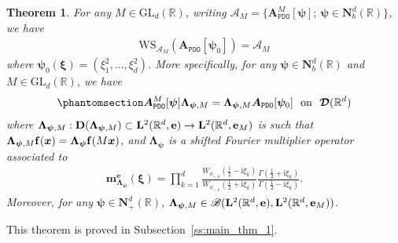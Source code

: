 \documentclass[12pt]{amsart}
\newcommand{\hlabel}{\phantomsection\label}
\numberwithin{equation}{section}
\newcommand{\bb}{\mathbb}
\newcommand{\cc}{\mathcal}
\newcommand{\ccP}{\mathscr{P}}
\newcommand{\ttt}{\mathtt}
\newcommand{\bmrm}[2][2]{\mathbf{#2}^{#1}}
\newcommand{\AM}{\bm{A}^M}
\newcommand{\D}{\mathbf{D}}
\newcommand{\LL}{\Lambda}
\renewcommand{\i}{\mathrm{i}}
\newcommand{\LLRe}{\bmrm{L}(\bb R^d,{\bf e})}
\newcommand{\NN}{\mathbf{N}}
\newcommand{\ccA}{\mathscr{A}}
\newcommand{\cD}{\mathcal{D}}
\newtheorem{thm}{Theorem}[section]
\theoremstyle{definition}
\theoremstyle{assump}
\theoremstyle{remark}
\begin{document}
	\begin{thm}\hlabel{thm1:main_thm_1} For any $M\in\mathrm{GL}_d(\bb R)$, writing $ \mathscr{A}_M=\{\bm{A}^M_{\ttt{PDO}}[\bm{\psi}]; \: \bm{\psi}\in\NN^d_b(\bb R)\}$, we have
			\begin{align*}
				\mathrm{WS}_{\ccA_M}(\bm{A}_\ttt{PDO}[\bm\psi_0])=\ccA_M
			\end{align*}
where $\bm{\psi}_0(\bm{\xi})=(\xi^2_1,\ldots,\xi^2_d)$. More specifically, for any $\bm{\psi}\in\NN^d_b(\bb R)$ and $M\in\mathrm{GL}_d(\bb{R})$, we have
\begin{align} \hlabel{eq:wsob}
	\AM_\ttt{PDO}[\bm\psi]\bm{\LL}_{\bm\psi,M}=\bm{\LL}_{\bm\psi,M}\bm{A}_\ttt{PDO}[\bm\psi_0] \ \text{ on } \ \bm{\cc{D}}(\bb R^d)
\end{align}
where $\bm{\Lambda}_{\bm \psi,M}:\D(\bm{\Lambda}_{\bm \psi,M}) \subset \LLRe\to \bmrm{L}(\bb R^d,{\bf e}_M)$ is such that $\bm{\Lambda}_{\bm\psi,M}{\bf f}(\bm x)=\bm{\Lambda_\psi}{\bf f}(M\bm x)$, and $\bm{\Lambda}_{\bm \psi}$ is a shifted Fourier multiplier operator associated to
\begin{align*}
	\mathbf{m}^{\mathbf{e}}_{\bm{\Lambda}_{\bm\psi}}(\bm{\xi})=\prod_{k=1}^d \frac{W_{\phi_{+,k}}(\frac{1}{2}-\i\xi_k)}{W_{\phi_{-,k}}(\frac{1}{2}+\i\xi_k)}\frac{\Gamma(\frac{1}{2}+\i\xi_k)}{\Gamma(\frac{1}{2}-\i\xi_k)}.
\end{align*}
Moreover, for any $\bm{\psi}\in\NN^d_+(\bb R)$, $\bm{\LL}_{\bm\psi,M}\in\mathscr{B}(\bmrm{L}(\bb{R}^d,{\bf e}),\bmrm{L}(\bb{R}^d,{\bf e}_M))$.
	\end{thm}
This theorem is proved in Subsection~\ref{ss:main_thm_1}.
\end{document}
